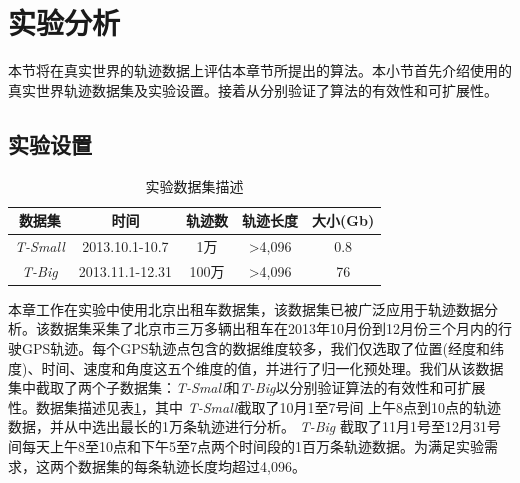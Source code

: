  \section{实验分析}\label{sec-c4-Exp}
本节将在真实世界的轨迹数据上评估本章节所提出的算法。本小节首先介绍使用的真实世界轨迹数据集及实验设置。接着从分别验证了算法的有效性和可扩展性。

\subsection{实验设置}

\begin{table}[t]
	\centering  
	\renewcommand\arraystretch{1.2}
	\begin{tabular}{|c|c|c|c|c|} 
		\hline
		数据集 & 时间 & 轨迹数 & 轨迹长度&大小(Gb)  \\ \hline
		\emph{T-Small} & 2013.10.1-10.7 & 1万 & >4,096 & 0.8  \\ \hline
		\emph{T-Big}  & 2013.11.1-12.31& 100万 & >4,096 & 76\\ \hline
	\end{tabular}
	\caption{实验数据集描述}
	\label{table:expdata}
\end{table}

本章工作在实验中使用北京出租车数据集，该数据集已被广泛应用于轨迹数据分析。该数据集采集了北京市三万多辆出租车在2013年10月份到12月份三个月内的行驶GPS轨迹。每个GPS轨迹点包含的数据维度较多，我们仅选取了位置(经度和纬度)、时间、速度和角度这五个维度的值，并进行了归一化预处理。我们从该数据集中截取了两个子数据集：\emph{T-Small}和\emph{T-Big}以分别验证算法的有效性和可扩展性。数据集描述见表\ref{table:expdata}，其中
\emph{T-Small}截取了10月1至7号间 上午8点到10点的轨迹数据，并从中选出最长的1万条轨迹进行分析。
\emph{T-Big} 截取了11月1号至12月31号间每天上午8至10点和下午5至7点两个时间段的1百万条轨迹数据。为满足实验需求，这两个数据集的每条轨迹长度均超过4,096。

